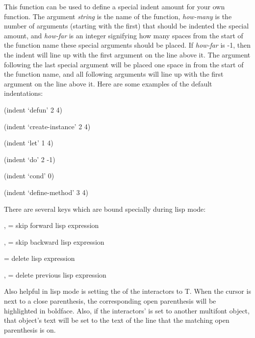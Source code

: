 This function can be used to define a special indent amount for your
own function.  The
argument {\it string} is the name of the function, {\it how-many} is the number
of arguments (starting with the first) that should be indented the special
amount, and {\it how-far} is an integer signifying how many spaces from the
start of the function name these special arguments should be placed.  If
{\it how-far} is -1, then the indent will line up with the first argument on the
line above it.  The argument following the last special argument will be
placed one space in from the start of the function name, and all following
arguments will line up with the first argument on the line above it.
Here are some examples of the default indentations:

\vspace{1 line}
\begin{text}
(indent `defun' 2 4)

(indent `create-instance' 2 4)

(indent `let' 1 4)

(indent `do' 2 -1)

(indent `cond' 0)

(indent `define-method' 3 4)
\end{text}
\vspace{1 line}

There are several keys which are bound specially during lisp mode:

\begin{description}
\item[] ,  = skip forward lisp expression

\item[] ,  = skip backward lisp expression

\item[]  = delete lisp expression

\item[] ,  = delete previous lisp expression
\end{description}

 
Also helpful in lisp mode is setting the  of the
interactors to T.  When the cursor is next to a close parenthesis, the
corresponding open parenthesis will be highlighted in boldface.  Also, if
the interactors'  is set to another multifont object, that
object's text will be set to the text of the line that the matching
open parenthesis is on.

